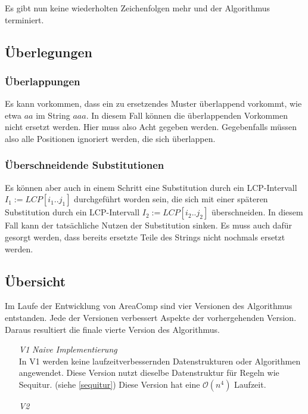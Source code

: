 Es gibt nun keine wiederholten Zeichenfolgen mehr und der Algorithmus terminiert.

\subsection{Überlegungen}

\subsubsection{Überlappungen}

Es kann vorkommen, dass ein zu ersetzendes Muster überlappend vorkommt, wie etwa $aa$ im String $aaa$. In diesem Fall können die überlappenden Vorkommen nicht ersetzt werden. Hier muss also Acht gegeben werden. Gegebenfalls müssen also alle Positionen ignoriert werden, die sich überlappen.

\subsubsection{Überschneidende Substitutionen}

Es können aber auch in einem Schritt eine Substitution durch ein LCP-Intervall $I_1 := LCP[i_1..j_1]$ durchgeführt worden sein, die sich mit einer späteren Substitution durch ein LCP-Intervall $I_2 := LCP[i_2..j_2]$ überschneiden. In diesem Fall kann der tatsächliche Nutzen der Substitution sinken. Es muss auch dafür gesorgt werden, dass bereits ersetzte Teile des Strings nicht nochmals ersetzt werden.

\subsection{Übersicht}

Im Laufe der Entwicklung von AreaComp sind vier Versionen des Algorithmus entstanden. Jede der Versionen verbessert Aspekte der vorhergehenden Version. Daraus resultiert die finale vierte Version des Algorithmus.

\begin{itemize}
    \item[\emph{V1}] \emph{Naive Implementierung}\\
    In V1 werden keine laufzeitverbessernden Datenstrukturen oder Algorithmen angewendet.
    Diese Version nutzt dieselbe Datenstruktur für Regeln wie Sequitur. (siehe \autoref{sequitur}) Diese Version hat eine $\mathcal{O}(n^4)$ Laufzeit.
    \item[\emph{V2}] \emph{}
\end{itemize}

\newpage

\newpage

\newpage

\newpage


